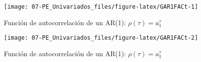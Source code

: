 \documentclass[
]{book}
\newenvironment{Shaded}{\begin{snugshade}}{\end{snugshade}}
\newcommand{\AttributeTok}[1]{\textcolor[rgb]{0.77,0.63,0.00}{#1}}
\newcommand{\DecValTok}[1]{\textcolor[rgb]{0.00,0.00,0.81}{#1}}
\newcommand{\FunctionTok}[1]{\textcolor[rgb]{0.00,0.00,0.00}{#1}}
\newcommand{\NormalTok}[1]{#1}
\newcommand{\SpecialCharTok}[1]{\textcolor[rgb]{0.00,0.00,0.00}{#1}}
\newcommand{\StringTok}[1]{\textcolor[rgb]{0.31,0.60,0.02}{#1}}
\begin{document}
\begin{figure}

{\centering \texttt{[image: 07-PE\_Univariados\_files/figure-latex/GAR1FACt-1]} 

}

\caption{Función de autocorrelación de un AR(1): $\rho(\tau)= a_1^\tau$}\label{fig:GAR1FACt-1}
\end{figure}

\begin{Shaded}
\end{Shaded}

\begin{figure}

{\centering \texttt{[image: 07-PE\_Univariados\_files/figure-latex/GAR1FACt-2]} 

}

\caption{Función de autocorrelación de un AR(1): $\rho(\tau)= a_1^\tau$}\label{fig:GAR1FACt-2}
\end{figure}
\end{document}
